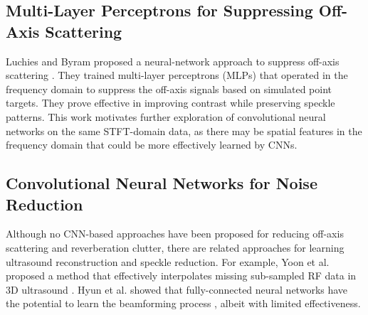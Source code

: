 
    \subsection{Multi-Layer Perceptrons for Suppressing Off-Axis Scattering}
      Luchies and Byram proposed a neural-network approach to suppress off-axis scattering \cite{luchies_tmi_2018, training_improvements}. They trained multi-layer perceptrons (MLPs) that operated in the frequency domain to suppress the off-axis signals based on simulated point targets. They prove effective in improving contrast while preserving speckle patterns. This work motivates further exploration of convolutional neural networks on the same STFT-domain data, as there may be spatial features in the frequency domain that could be more effectively learned by CNNs.

    \subsection{Convolutional Neural Networks for Noise Reduction}
      Although no CNN-based approaches have been proposed for reducing off-axis scattering and reverberation clutter, there are related approaches for learning ultrasound reconstruction and speckle reduction. For example, Yoon et al. proposed a method that effectively interpolates missing sub-sampled RF data in 3D ultrasound \cite{yoon2018efficient}. Hyun et al. showed that fully-connected neural networks have the potential to learn the beamforming process \cite{hyun2019beamforming}, albeit with limited effectiveness.

%
%
%


